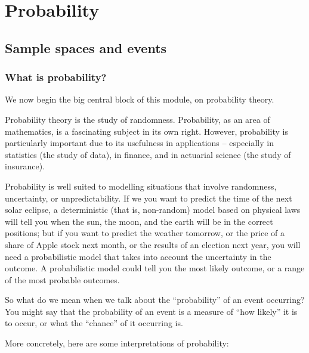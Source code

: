 \documentclass[
  letterpaper,
]{report}
\theoremstyle{definition}
\theoremstyle{definition}
\theoremstyle{remark}
\begin{document}
\part{Probability}

\hypertarget{L03-events}{%
\chapter{Sample spaces and events}\label{L03-events}}

\renewcommand{\complement}{\mathsf{c}}
\newcommand{\comp}{\complement}
\newcommand{\ff}[2]{{#1}^{\underline{#2}}}

\hypertarget{what-is-prob}{%
\section{What is probability?}\label{what-is-prob}}

We now begin the big central block of this module, on probability
theory.

Probability theory is the study of randomness. Probability, as an area
of mathematics, is a fascinating subject in its own right. However,
probability is particularly important due to its usefulness in
applications -- especially in statistics (the study of data), in
finance, and in actuarial science (the study of insurance).

Probability is well suited to modelling situations that involve
randomness, uncertainty, or unpredictability. If we you want to predict
the time of the next solar eclipse, a deterministic (that is,
non-random) model based on physical laws will tell you when the sun, the
moon, and the earth will be in the correct positions; but if you want to
predict the weather tomorrow, or the price of a share of Apple stock
next month, or the results of an election next year, you will need a
probabilistic model that takes into account the uncertainty in the
outcome. A probabilistic model could tell you the most likely outcome,
or a range of the most probable outcomes.

So what do we mean when we talk about the ``probability'' of an event
occurring? You might say that the probability of an event is a measure
of ``how likely'' it is to occur, or what the ``chance'' of it occurring
is.

More concretely, here are some interpretations of probability:
\end{document}
